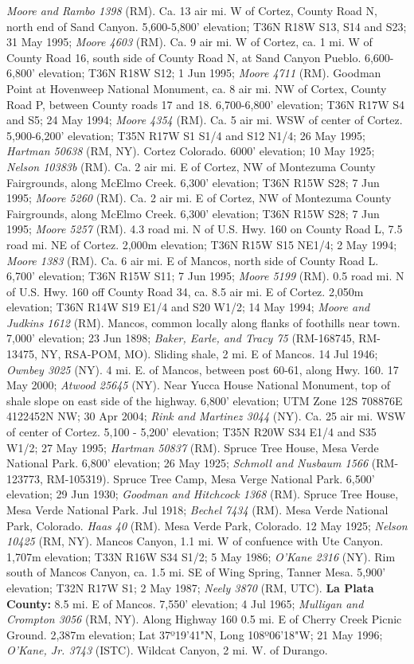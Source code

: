 \textit{Moore and Rambo 1398} (RM).  Ca. 13 air mi. W of Cortez, County Road N, north end of Sand Canyon. 5,600-5,800' elevation; T36N R18W S13, S14 and S23; 31 May 1995; \textit{Moore 4603} (RM).  Ca. 9 air mi. W of Cortez, ca. 1 mi. W of County Road 16, south side of County Road N, at Sand Canyon Pueblo. 6,600-6,800' elevation; T36N R18W S12; 1 Jun 1995; \textit{Moore 4711} (RM).  Goodman Point at Hovenweep National Monument, ca. 8 air mi. NW of Cortex, County Road P, between County roads 17 and 18. 6,700-6,800' elevation; T36N R17W S4 and S5; 24 May 1994; \textit{Moore 4354} (RM).  Ca. 5 air mi. WSW of center of Cortez. 5,900-6,200' elevation; T35N R17W S1 S1/4 and S12 N1/4; 26 May 1995; \textit{Hartman 50638} (RM, NY).  Cortez Colorado. 6000' elevation; 10 May 1925; \textit{Nelson 10383b} (RM).  Ca. 2 air mi. E of Cortez, NW of Montezuma County Fairgrounds, along McElmo Creek. 6,300' elevation; T36N R15W S28; 7 Jun 1995; \textit{Moore 5260} (RM).  Ca. 2 air mi. E of Cortez, NW of Montezuma County Fairgrounds, along McElmo Creek. 6,300' elevation; T36N R15W S28; 7 Jun 1995; \textit{Moore 5257} (RM).  4.3 road mi. N of U.S. Hwy. 160 on County Road L, 7.5 road mi. NE of Cortez. 2,000m elevation; T36N R15W S15 NE1/4; 2 May 1994; \textit{Moore 1383} (RM).  Ca. 6 air mi. E of Mancos, north side of County Road L. 6,700' elevation; T36N R15W S11; 7 Jun 1995; \textit{Moore 5199} (RM).  0.5 road mi. N of U.S. Hwy. 160 off County Road 34, ca. 8.5 air mi. E of Cortez. 2,050m elevation; T36N R14W S19 E1/4 and S20 W1/2; 14 May 1994; \textit{Moore and Judkins 1612} (RM).  Mancos, common locally along flanks of foothills near town. 7,000' elevation; 23 Jun 1898; \textit{Baker, Earle, and Tracy 75} (RM-168745, RM-13475, NY, RSA-POM, MO).  Sliding shale, 2 mi. E of Mancos. 14 Jul 1946; \textit{Ownbey 3025} (NY).  4 mi. E. of Mancos, between post 60-61, along Hwy. 160. 17 May 2000; \textit{Atwood 25645} (NY).  Near Yucca House National Monument, top of shale slope on east side of the highway. 6,800' elevation; UTM Zone 12S 708876E 4122452N NW; 30 Apr 2004; \textit{Rink and Martinez 3044} (NY).  Ca. 25 air mi. WSW of center of Cortez. 5,100 - 5,200' elevation; T35N R20W S34 E1/4 and S35 W1/2; 27 May 1995; \textit{Hartman 50837} (RM).  Spruce Tree House, Mesa Verde National Park. 6,800' elevation; 26 May 1925; \textit{Schmoll and Nusbaum 1566} (RM-123773, RM-105319).  Spruce Tree Camp, Mesa Verge National Park. 6,500' elevation; 29 Jun 1930; \textit{Goodman and Hitchcock 1368} (RM).  Spruce Tree House, Mesa Verde National Park. Jul 1918; \textit{Bechel 7434} (RM).  Mesa Verde National Park, Colorado. \textit{Haas 40} (RM).  Mesa Verde Park, Colorado. 12 May 1925; \textit{Nelson 10425} (RM, NY).  Mancos Canyon, 1.1 mi. W of confuence with Ute Canyon. 1,707m elevation; T33N R16W S34 S1/2; 5 May 1986; \textit{O'Kane 2316} (NY).  Rim south of Mancos Canyon, ca. 1.5 mi. SE of Wing Spring, Tanner Mesa. 5,900' elevation; T32N R17W S1; 2 May 1987; \textit{Neely 3870} (RM, UTC).  \textbf{La Plata County:} 8.5 mi. E of Mancos. 7,550' elevation; 4 Jul 1965; \textit{Mulligan and Crompton 3056} (RM, NY).  Along Highway 160 0.5 mi. E of Cherry Creek Picnic Ground. 2,387m elevation; Lat 37º19'41"N, Long 108º06'18"W; 21 May 1996; \textit{O'Kane, Jr.  3743} (ISTC).  Wildcat Canyon, 2 mi. W. of Durango. 